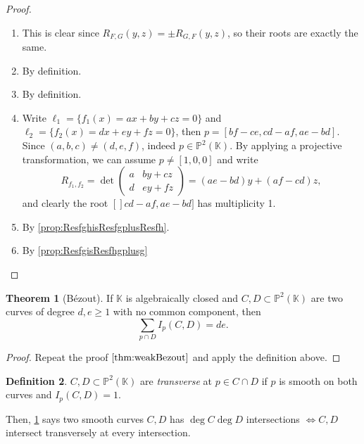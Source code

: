\documentclass{article}
\newcommand{\K}{\mathbb{K}}
\newcommand{\p}{\mathbb{P}}
\theoremstyle{definition}
\newtheorem{defn}{Definition}[subsection]
\newtheorem{thm}[defn]{Theorem}
\begin{document}
\begin{proof}
\begin{enumerate}
\item This is clear since $R_{F,G}(y,z)=\pm R_{G,F}(y,z)$, so their roots are exactly the same.
\item By definition.
\item By definition.
\item Write $\ell_1=\{f_1(x)=ax+by+cz=0\}$ and $\ell_2=\{f_2(x)=dx+ey+fz=0\}$, then $p=[bf-ce,cd-af,ae-bd]$. Since $(a,b,c)\neq (d,e,f)$, indeed $p\in\p^2(\K)$. By applying a projective transformation, we can assume $p\neq [1,0,0]$ and write
\[
R_{f_1,f_2}=\det\begin{pmatrix}
a & by+cz \\ d & ey+fz
\end{pmatrix}=(ae-bd)y+(af-cd)z,
\]
and clearly the root $[]cd-af,ae-bd]$ has multiplicity 1. 
\item By \ref{prop:ResfghisResfgplusResfh}.
\item By \ref{prop:ResfgisResfhgplusg}
\end{enumerate}
\end{proof}

\begin{thm}[Bézout]
\label{thm:strongBezout}
If $\K$ is algebraically closed and $C,D\subset\p^2(\K)$ are two curves of degree $d,e\geq 1$ with no common component, then
\[
\sum_{p\cap D}I_p(C,D)=de.
\]
\end{thm}
\begin{proof}
Repeat the proof $\ref{thm:weakBezout}$ and apply the definition above.
\end{proof}

\begin{defn}
$C,D\subset\p^2(\K)$ are \textit{transverse} at $p\in C\cap D$ if $p$ is smooth on both curves and $I_p(C,D)=1$.
\end{defn}
Then, \ref{thm:strongBezout} says two smooth curves $C,D$ has $\deg C\deg D$ intersections $\iff C,D$ intersect transversely at every intersection.
\end{document}
